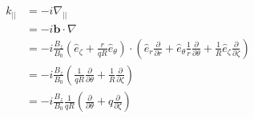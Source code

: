 \begin{eqnarray}
\begin{aligned}
    k_{||}{}&=-i\nabla_{||}\\
    &=-i\textbf{b}\cdot \nabla \\
    &=-i\frac{B_z}{B_0}(\hat{e}_{\zeta}+\frac{r}{qR}\hat{e}_{\theta})\cdot(\hat{e}_{r}\frac{\partial}{\partial r}+\hat{e}_{\theta}\frac{1}{r}\frac{\partial}{\partial \theta}+\frac{1}{R}\hat{e}_{\zeta}\frac{\partial}{\partial \zeta})\\
    &=-i\frac{B_z}{B_0}(\frac{1}{qR}\frac{\partial}{\partial \theta }+\frac{1}{R}\frac{\partial}{\partial \zeta})\\
    &= -i \frac{B_z}{B_0}\frac{1}{qR}(\frac{\partial}{\partial \theta }+q\frac{\partial}{\partial \zeta})
\end{aligned}
\end{eqnarray}

